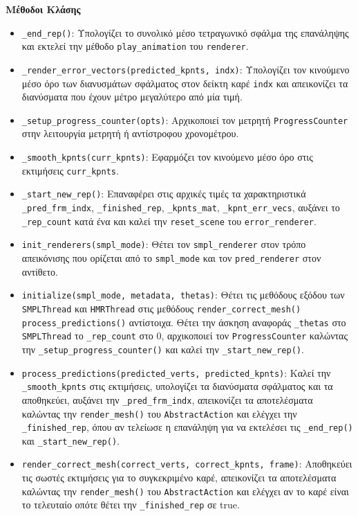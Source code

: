 \noindent\textbf{Μέθοδοι Κλάσης}
\begin{itemize}
	\item \texttt{\_end\_rep()}: Υπολογίζει το συνολικό μέσο τετραγωνικό σφάλμα της επανάληψης και εκτελεί την μέθοδο \texttt{play\_animation} του \texttt{renderer}.
	\item \texttt{\_render\_error\_vectors(predicted\_kpnts, indx)}: Υπολογίζει τον κινούμενο μέσο όρο των διανυσμάτων σφάλματος στον δείκτη καρέ \texttt{indx} και απεικονίζει τα διανύσματα που έχουν μέτρο μεγαλύτερο από μία τιμή.
	\item \texttt{\_setup\_progress\_counter(opts)}: Αρχικοποιεί τον μετρητή \texttt{ProgressCounter} στην λειτουργία μετρητή ή αντίστροφου χρονομέτρου.
	\item \texttt{\_smooth\_kpnts(curr\_kpnts)}: Εφαρμόζει τον κινούμενο μέσο όρο στις εκτιμήσεις \texttt{curr\_kpnts}.
	\item \texttt{\_start\_new\_rep()}: Επαναφέρει στις αρχικές τιμές τα χαρακτηριστικά \texttt{\_pred\_frm\_indx}, \texttt{\_finished\_rep}, \texttt{\_kpnts\_mat}, \texttt{\_kpnt\_err\_vecs}, αυξάνει το \texttt{\_rep\_count} κατά ένα και καλεί την \texttt{reset\_scene} του \texttt{error\_renderer}.
	\item \texttt{init\_renderers(smpl\_mode)}: Θέτει τον \texttt{smpl\_renderer} στον τρόπο απεικόνισης που ορίζεται από το \texttt{smpl\_mode} και τον \texttt{pred\_renderer} στον αντίθετο. 
	\item \texttt{initialize(smpl\_mode, metadata, thetas)}: Θέτει τις μεθόδους εξόδου των \texttt{SMPLThread} και \texttt{HMRThread} στις μεθόδους \texttt{render\_correct\_mesh()} \texttt{process\_predictions()} αντίστοιχα. Θέτει την άσκηση αναφοράς \texttt{\_thetas} στο \texttt{SMPLThread} το \texttt{\_rep\_count} στο 0, αρχικοποιεί τον \texttt{ProgressCounter} καλώντας την \texttt{\_setup\_progress\_counter()} και καλεί την \texttt{\_start\_new\_rep()}.
	\item \texttt{process\_predictions(predicted\_verts, predicted\_kpnts)}: Καλεί την \texttt{\_smooth\_kpnts} στις εκτιμήσεις, υπολογίζει τα διανύσματα σφάλματος και τα αποθηκεύει, αυξάνει την \texttt{\_pred\_frm\_indx}, απεικονίζει τα αποτελέσματα καλώντας την \texttt{render\_mesh()} του \texttt{AbstractAction} και ελέγχει την \texttt{\_finished\_rep}, όπου αν τελείωσε η επανάληψη για να εκτελέσει τις \texttt{\_end\_rep()} και \texttt{\_start\_new\_rep()}.
	\item \texttt{render\_correct\_mesh(correct\_verts, correct\_kpnts, frame)}: Αποθηκεύει τις σωστές εκτιμήσεις για το συγκεκριμένο καρέ, απεικονίζει τα αποτελέσματα καλώντας την \texttt{render\_mesh()} του \texttt{AbstractAction} και ελέγχει αν το καρέ είναι το τελευταίο οπότε θέτει την \texttt{\_finished\_rep} σε true.
\end{itemize}

